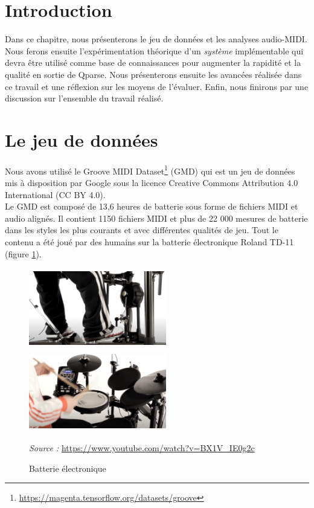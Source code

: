 \section*{Introduction}
Dans ce chapitre, nous présenterons le jeu de données et les analyses
audio-MIDI. Nous ferons ensuite l’expérimentation théorique d’un
\textit{système} implémentable qui devra être utilisé comme base de
connaissances pour augmenter la rapidité et la qualité en sortie de Qparse.
Nous présenterons ensuite les avancées réalisée dans ce travail et une
réflexion sur les moyens de l’évaluer. Enfin, nous finirons par une discussion
sur l’ensemble du travail réalisé.
\section{Le jeu de données}
Nous avons utilisé le Groove MIDI
Dataset\footnote{\url{https://magenta.tensorflow.org/datasets/groove}}
\cite{groove2019} (GMD) qui est un jeu de données mis à disposition par Google
sous la licence Creative Commons Attribution 4.0 International (CC BY 4.0).\\
Le GMD est composé de 13,6 heures de batterie sous forme de fichiers MIDI et
audio alignés. Il contient 1150 fichiers MIDI et plus de 22 000 mesures de
batterie dans les styles les plus courants et avec différentes qualités de jeu.
Tout le contenu a été joué par des humains sur la batterie électronique Roland
TD-11 (figure \ref{electro_drums}).\newpage
\begin{figure}[h]
	\centering
	\includegraphics[height=35mm, width=60mm]
    {z_images/4_experimentations/0_groove/0_roland.png}\ \ 
	\includegraphics[height=35mm, width=60mm]
    {z_images/4_experimentations/0_groove/1_roland.png}
	\caption{Batterie électronique}
	\label{electro_drums}
	\textit{Source :} \url{https://www.youtube.com/watch?v=BX1V_IE0g2c}
\end{figure}
